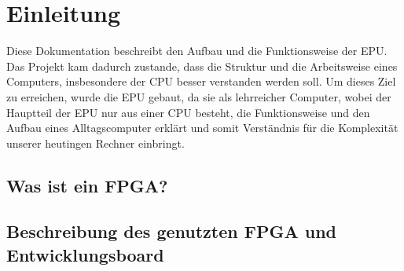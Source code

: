 \chapter{Einleitung}
\label{c:einleitung}
Diese Dokumentation beschreibt den Aufbau und die Funktionsweise der \ac{EPU}. Das Projekt kam
dadurch zustande, dass die Struktur und die Arbeitsweise eines Computers, insbesondere der
\ac{CPU} besser verstanden werden soll. Um dieses Ziel zu erreichen, wurde die \ac{EPU} gebaut, da
sie als lehrreicher Computer, wobei der Hauptteil der \ac{EPU} nur aus einer \ac{CPU} besteht, die
Funktionsweise und den Aufbau eines Alltagscomputer erklärt und somit Verständnis für die
Komplexität unserer heutingen Rechner einbringt.
\section{Was ist ein FPGA?}
\section{Beschreibung des genutzten FPGA und Entwicklungsboard}
